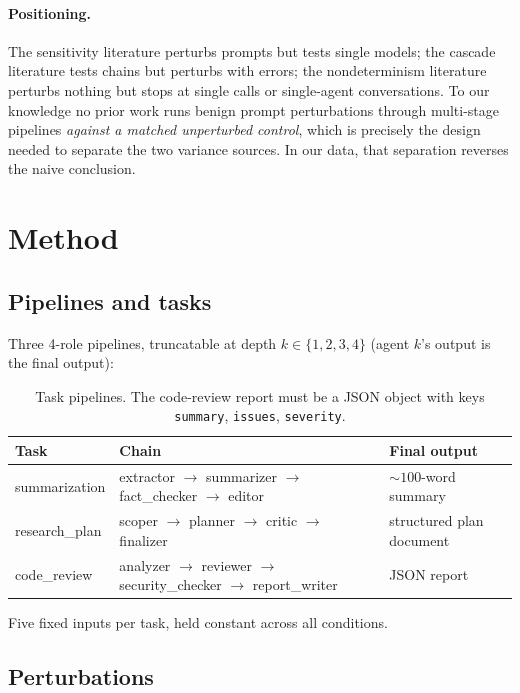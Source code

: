 \documentclass[11pt]{article}
\begin{document}
\paragraph{Positioning.} The sensitivity literature perturbs prompts but
tests single models; the cascade literature tests chains but perturbs with
errors; the nondeterminism literature perturbs nothing but stops at single
calls or single-agent conversations. To our knowledge no prior work runs
benign prompt perturbations through multi-stage pipelines \emph{against a
matched unperturbed control}, which is precisely the design needed to
separate the two variance sources. In our data, that separation reverses
the naive conclusion.

\section{Method}

\subsection{Pipelines and tasks}

Three 4-role pipelines, truncatable at depth $k \in \{1,2,3,4\}$ (agent
$k$'s output is the final output):

\begin{table}[h]
\centering\small
\begin{tabular}{lll}
\toprule
Task & Chain & Final output \\
\midrule
summarization & extractor $\to$ summarizer $\to$ fact\_checker $\to$ editor & ${\sim}100$-word summary \\
research\_plan & scoper $\to$ planner $\to$ critic $\to$ finalizer & structured plan document \\
code\_review & analyzer $\to$ reviewer $\to$ security\_checker $\to$ report\_writer & JSON report \\
\bottomrule
\end{tabular}
\caption{Task pipelines. The code-review report must be a JSON object with
keys \texttt{summary}, \texttt{issues}, \texttt{severity}.}
\end{table}

Five fixed inputs per task, held constant across all conditions.

\subsection{Perturbations}
\end{document}
